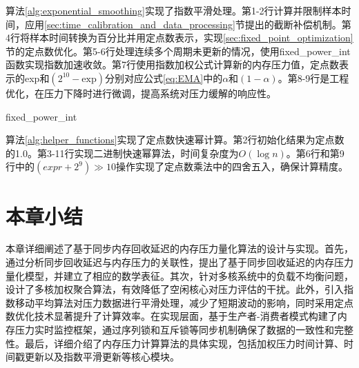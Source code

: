算法\ref{alg:exponential_smoothing}实现了指数平滑处理。第1-2行计算并限制样本时间，应用\ref{sec:time_calibration_and_data_processing}节提出的截断补偿机制。第4行将样本时间转换为百分比并用定点数表示，实现\ref{sec:fixed_point_optimization}节的定点数优化。第5-6行处理连续多个周期未更新的情况，使用fixed\_power\_int函数实现指数加速收敛。第7行使用指数加权公式计算新的内存压力值，定点数表示的exp和$(2^{10}-\text{exp})$分别对应公式\ref{eq:EMA}中的$\alpha$和$(1-\alpha)$。第8-9行是工程优化，在压力下降时进行微调，提高系统对压力缓解的响应性。

\begin{algorithm}[htbp]
    \caption{fixed\_power\_int}
    \label{alg:helper_functions}

\end{algorithm}

算法\ref{alg:helper_functions}实现了定点数快速幂计算。第2行初始化结果为定点数的1.0。第3-11行实现二进制快速幂算法，时间复杂度为$O(\log n)$。第6行和第9行中的$(expr + 2^9) \gg 10$操作实现了定点数乘法中的四舍五入，确保计算精度。


\section{本章小结}
本章详细阐述了基于同步内存回收延迟的内存压力量化算法的设计与实现。首先，通过分析同步回收延迟与内存压力的关联性，提出了基于同步回收延迟的内存压力量化模型，并建立了相应的数学表征。其次，针对多核系统中的负载不均衡问题，设计了多核加权聚合算法，有效降低了空闲核心对压力评估的干扰。此外，引入指数移动平均算法对压力数据进行平滑处理，减少了短期波动的影响，同时采用定点数优化技术显著提升了计算效率。在实现层面，基于生产者-消费者模式构建了内存压力实时监控框架，通过序列锁和互斥锁等同步机制确保了数据的一致性和完整性。最后，详细介绍了内存压力计算算法的具体实现，包括加权压力时间计算、时间戳更新以及指数平滑更新等核心模块。